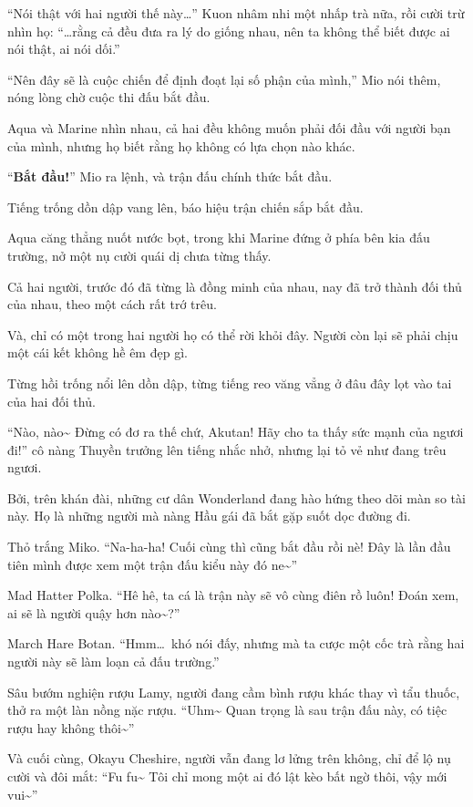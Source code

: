\documentclass[../main.tex]{subfiles}
\begin{document}
``Nói thật với hai người thế này\dots'' Kuon nhâm nhi một nhấp trà nữa, rồi cười trừ nhìn họ: ``\dots rằng cả đều đưa ra lý do giống nhau, nên ta không thể biết được ai nói thật, ai nói dối.''

``Nên đây sẽ là cuộc chiến để định đoạt lại số phận của mình,'' Mio nói thêm, nóng lòng chờ cuộc thi đấu bắt đầu.

Aqua và Marine nhìn nhau, cả hai đều không muốn phải đối đầu với người bạn của mình, nhưng họ biết rằng họ không có lựa chọn nào khác.

``\textbf{Bắt đầu!}'' Mio ra lệnh, và trận đấu chính thức bắt đầu.

Tiếng trống dồn dập vang lên, báo hiệu trận chiến sắp bắt đầu.

Aqua căng thẳng nuốt nước bọt, trong khi Marine đứng ở phía bên kia đấu trường, nở một nụ cười quái dị chưa từng thấy.

Cả hai người, trước đó đã từng là đồng minh của nhau, nay đã trở thành đối thủ của nhau, theo một cách rất trớ trêu.

Và, chỉ có một trong hai người họ có thể rời khỏi đây. Người còn lại sẽ phải chịu một cái kết không hề êm đẹp gì.

Từng hồi trống nổi lên dồn dập, từng tiếng reo văng vẳng ở đâu đây lọt vào tai của hai đối thủ.

``Nào, nào\~{} Đừng có đơ ra thế chứ, Akutan! Hãy cho ta thấy sức mạnh của ngươi đi!'' cô nàng Thuyền trưởng lên tiếng nhắc nhở, nhưng lại tỏ vẻ như đang trêu ngươi.

Bởi, trên khán đài, những cư dân Wonderland đang hào hứng theo dõi màn so tài này. Họ là những người mà nàng Hầu gái đã bắt gặp suốt dọc đường đi.

Thỏ trắng Miko. ``Na-ha-ha! Cuối cùng thì cũng bắt đầu rồi nè! Đây là lần đầu tiên mình được xem một trận đấu kiểu này đó ne\~{}''

Mad Hatter Polka. ``Hê hê, ta cá là trận này sẽ vô cùng điên rồ luôn! Đoán xem, ai sẽ là người quậy hơn nào\~{}?''

March Hare Botan. ``Hmm\dots\ khó nói đấy, nhưng mà ta cược một cốc trà rằng hai người này sẽ làm loạn cả đấu trường.''

Sâu bướm nghiện rượu Lamy, người đang cầm bình rượu khác thay vì tẩu thuốc, thở ra một làn nồng nặc rượu. ``Uhm\~{} Quan trọng là sau trận đấu này, có tiệc rượu hay không thôi\~{}''

Và cuối cùng, Okayu Cheshire, người vẫn đang lơ lửng trên không, chỉ để lộ nụ cười và đôi mắt: ``Fu fu\~{} Tôi  chỉ mong một ai đó lật kèo bất ngờ thôi, vậy mới vui\~{}''
\end{document}
